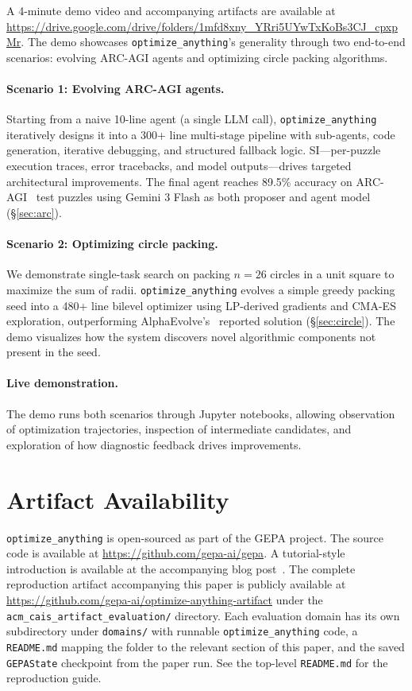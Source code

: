 \documentclass[sigconf]{acmart}
\newcommand{\oa}{\texttt{optimize\_anything}}
\newcommand{\asi}{SI}
\begin{document}
A 4-minute demo video and accompanying artifacts are available at \url{https://drive.google.com/drive/folders/1mfd8xny_YRri5UYwTxKoBs3CJ_cpxpMr}. The demo showcases \oa{}'s generality through two end-to-end scenarios: evolving ARC-AGI agents and optimizing circle packing algorithms.

\paragraph{Scenario 1: Evolving ARC-AGI agents.} Starting from a naive 10-line agent (a single LLM call), \oa{} iteratively designs it into a 300+ line multi-stage pipeline with sub-agents, code generation, iterative debugging, and structured fallback logic. \asi{}---per-puzzle execution traces, error tracebacks, and model outputs---drives targeted architectural improvements. The final agent reaches 89.5\% accuracy on ARC-AGI~\cite{chollet2019arc} test puzzles using Gemini 3 Flash as both proposer and agent model (\S\ref{sec:arc}).

\paragraph{Scenario 2: Optimizing circle packing.} We demonstrate single-task search on packing $n{=}26$ circles in a unit square to maximize the sum of radii. \oa{} evolves a simple greedy packing seed into a 480+ line bilevel optimizer using LP-derived gradients and CMA-ES exploration, outperforming AlphaEvolve's~\cite{alphaevolve2025} reported solution (\S\ref{sec:circle}). The demo visualizes how the system discovers novel algorithmic components not present in the seed.

\paragraph{Live demonstration.} The demo runs both scenarios through Jupyter notebooks, allowing observation of optimization trajectories, inspection of intermediate candidates, and exploration of how diagnostic feedback drives improvements.

\section{Artifact Availability}\label{app:artifact}

\oa{} is open-sourced as part of the GEPA project. The source code is available at \url{https://github.com/gepa-ai/gepa}. A tutorial-style introduction is available at the accompanying blog post~\cite{agrawal2026oa_blog}. The complete reproduction artifact accompanying this paper is publicly available at \url{https://github.com/gepa-ai/optimize-anything-artifact} under the \texttt{acm\_cais\_artifact\_evaluation/} directory. Each evaluation
domain has its own subdirectory under \texttt{domains/} with runnable
\texttt{optimize\_anything} code, a \texttt{README.md} mapping the folder to the relevant section of this paper, and the saved \texttt{GEPAState} checkpoint from the paper run. See the top-level \texttt{README.md} for the reproduction guide.
\end{document}

